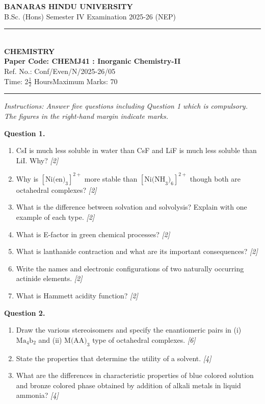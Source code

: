 \documentclass[11pt,a4paper]{article}
\newcommand{\pts}[1]{\hfill \textit{[#1]}}
\begin{document}
\begin{center}
  {\large\bfseries BANARAS HINDU UNIVERSITY}\\[2pt]
  {\normalsize B.Sc. (Hons) Semester IV Examination 2025-26 (NEP)}\\[6pt]
  \rule{0.8\linewidth}{0.5pt}\\[6pt]
  {\large\bfseries CHEMISTRY}\\[4pt]
  {\large\bfseries Paper Code: CHEMJ41 : Inorganic Chemistry-II}\\[2pt]
  {\small Ref. No.: Conf/Even/N/2025-26/05}\\[4pt]
  {\normalsize Time: 2$\frac{1}{2}$ Hours\hfill Maximum Marks: 70}
\end{center}

\rule{\linewidth}{0.4pt}

\smallskip

\noindent \textit{Instructions: Answer five questions including Question 1 which is compulsory. The figures in the right-hand margin indicate marks.}

\bigskip

\noindent \textbf{Question 1.}
\begin{enumerate}[label=(\alph*)]
  \item CsI is much less soluble in water than CsF and LiF is much less soluble than LiI. Why? \pts{2}
  \item Why is $[\text{Ni(en)}_3]^{2+}$ more stable than $[\text{Ni(NH}_3)_6]^{2+}$ though both are octahedral complexes? \pts{2}
  \item What is the difference between solvation and solvolysis? Explain with one example of each type. \pts{2}
  \item What is E-factor in green chemical processes? \pts{2}
  \item What is lanthanide contraction and what are its important consequences? \pts{2}
  \item Write the names and electronic configurations of two naturally occurring actinide elements. \pts{2}
  \item What is Hammett acidity function? \pts{2}
\end{enumerate}

\bigskip

\noindent \textbf{Question 2.}
\begin{enumerate}[label=(\alph*)]
  \item Draw the various stereoisomers and specify the enantiomeric pairs in (i) $\text{Ma}_4\text{b}_2$ and (ii) $\text{M(AA)}_3$ type of octahedral complexes. \pts{6}
  \item State the properties that determine the utility of a solvent. \pts{4}
  \item What are the differences in characteristic properties of blue colored solution and bronze colored phase obtained by addition of alkali metals in liquid ammonia? \pts{4}
\end{enumerate}
\end{document}
